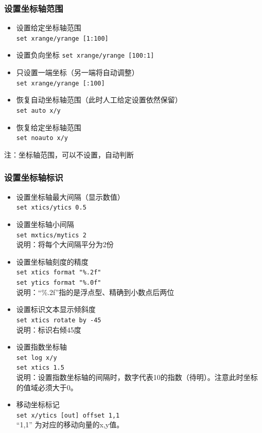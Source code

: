 \subsubsection{设置坐标轴范围}
\begin{itemize}
\item 设置给定坐标轴范围\\
\verb|set xrange/yrange [1:100]|

\item 设置负向坐标
\verb|set xrange/yrange [100:1]|

\item 只设置一端坐标（另一端将自动调整）\\
\verb|set xrange/yrange [:100]|

\item 恢复自动坐标轴范围（此时人工给定设置依然保留）\\
\verb|set auto x/y|

\item  恢复给定坐标轴范围\\
\verb|set noauto x/y|
\end{itemize}

注：坐标轴范围，可以不设置，自动判断



\subsubsection{设置坐标轴标识}
\begin{itemize}
\item 设置坐标轴最大间隔（显示数值）\\
\verb|set xtics/ytics 0.5|

\item 设置坐标轴小间隔\\
\verb|set mxtics/mytics 2|\\
说明：将每个大间隔平分为2份

\item 设置坐标轴刻度的精度\\
\verb|set xtics format "%.2f"|\\
\verb|set ytics format "%.0f"|\\
说明：“\%.2f”指的是浮点型、精确到小数点后两位

\item 设置标识文本显示倾斜度\\
\verb|set xtics rotate by -45|\\
说明：标识右倾45度

\item 设置指数坐标轴\\
\verb|set log x/y|\\
\verb|set xtics 1.5|\\
说明：设置指数坐标轴的间隔时，数字代表10的指数（待明）。注意此时坐标的值域必须大于0。

\item 移动坐标标记\\
\verb|set x/ytics [out] offset 1,1|\\
“1,1” 为对应的移动向量的x,y值。
\end{itemize}



